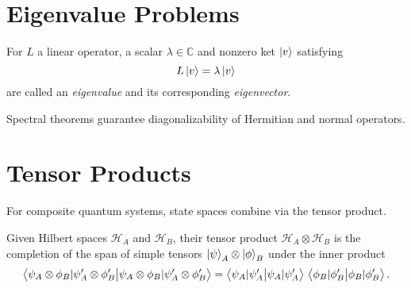 
%
%

\section{Eigenvalue Problems}
\begin{definition}
	For $L$ a linear operator, a scalar $\lambda\in\mathbb C$ and nonzero ket $\ket{v}$ satisfying
	\[ L\ket{v} = \lambda\ket{v} 
	\]
	are called an \emph{eigenvalue} and its corresponding \emph{eigenvector}.
\end{definition}

Spectral theorems guarantee diagonalizability of Hermitian and normal operators.

\section{Tensor Products}
For composite quantum systems, state spaces combine via the tensor product.
\begin{definition}
	Given Hilbert spaces $\mathcal H_A$ and $\mathcal H_B$, their tensor product $\mathcal H_A\otimes\mathcal H_B$ is the completion of the span of simple tensors $\ket{\psi}_A\otimes\ket{\phi}_B$ under the inner product
	\[ \braket{\psi_A\otimes\phi_B | \psi'_A\otimes\phi'_B} = \braket{\psi_A|\psi'_A}\,\braket{\phi_B|\phi'_B}. \]
\end{definition}

